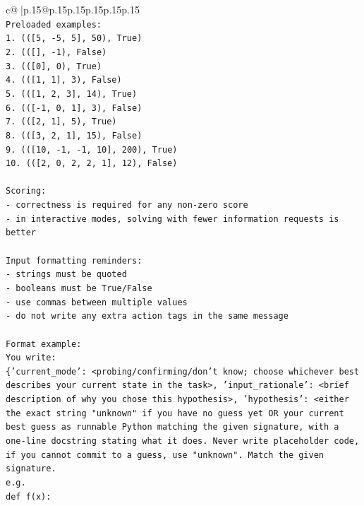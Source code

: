 \documentclass{article}
\begin{document}
{\begin{supertabular}{c@{$\;$}|p{.15\linewidth}@{}p{.15\linewidth}p{.15\linewidth}p{.15\linewidth}p{.15\linewidth}p{.15\linewidth}}
{{{\\ 
\texttt{Preloaded examples:} \\
\texttt{1. (({[}5, {-}5, 5{]}, 50), True)} \\
\texttt{2. (({[}{]}, {-}1), False)} \\
\texttt{3. (({[}0{]}, 0), True)} \\
\texttt{4. (({[}1, 1{]}, 3), False)} \\
\texttt{5. (({[}1, 2, 3{]}, 14), True)} \\
\texttt{6. (({[}{-}1, 0, 1{]}, 3), False)} \\
\texttt{7. (({[}2, 1{]}, 5), True)} \\
\texttt{8. (({[}3, 2, 1{]}, 15), False)} \\
\texttt{9. (({[}10, {-}1, {-}1, 10{]}, 200), True)} \\
\texttt{10. (({[}2, 0, 2, 2, 1{]}, 12), False)} \\
\\ 
\texttt{Scoring:} \\
\texttt{{-} correctness is required for any non{-}zero score} \\
\texttt{{-} in interactive modes, solving with fewer information requests is better} \\
\\ 
\texttt{Input formatting reminders:} \\
\texttt{{-} strings must be quoted} \\
\texttt{{-} booleans must be True/False} \\
\texttt{{-} use commas between multiple values} \\
\texttt{{-} do not write any extra action tags in the same message} \\
\\ 
\texttt{Format example:} \\
\texttt{You write:} \\
\texttt{\{'current\_mode': <probing/confirming/don't know; choose whichever best describes your current state in the task>, 'input\_rationale': <brief description of why you chose this hypothesis>, 'hypothesis': <either the exact string "unknown" if you have no guess yet OR your current best guess as runnable Python matching the given signature, with a one{-}line docstring stating what it does. Never write placeholder code, if you cannot commit to a guess, use "unknown". Match the given signature.} \\
\texttt{e.g.} \\
\texttt{def f(x):} \\
}}}
\end{supertabular}}
\end{document}

